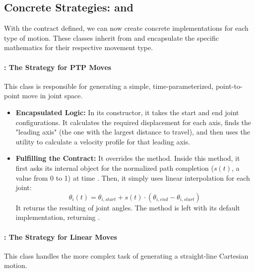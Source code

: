 \subsection{Concrete Strategies:  and }
\label{subsec:concrete_strategies}

With the contract defined, we can now create concrete implementations for each type of motion. These classes inherit from  and encapsulate the specific mathematics for their respective movement type.

\paragraph{: The Strategy for PTP Moves}
This class is responsible for generating a simple, time-parameterized, point-to-point move in joint space.

\begin{itemize}
    \item \textbf{Encapsulated Logic:} In its constructor, it takes the start and end joint configurations. It calculates the required displacement for each axis, finds the "leading axis" (the one with the largest distance to travel), and then uses the  utility to calculate a velocity profile for that leading axis.
    \item \textbf{Fulfilling the Contract:} It overrides the  method. Inside this method, it first asks its internal  object for the normalized path completion (\(s(t)\), a value from 0 to 1) at time . Then, it simply uses linear interpolation for each joint: 
    \[
    \theta_i(t) = \theta_{i,start} + s(t) \cdot (\theta_{i,end} - \theta_{i,start})
    \]
    It returns the resulting  of joint angles. The  method is left with its default implementation, returning .
\end{itemize}

\paragraph{: The Strategy for Linear Moves}
This class handles the more complex task of generating a straight-line Cartesian motion.

